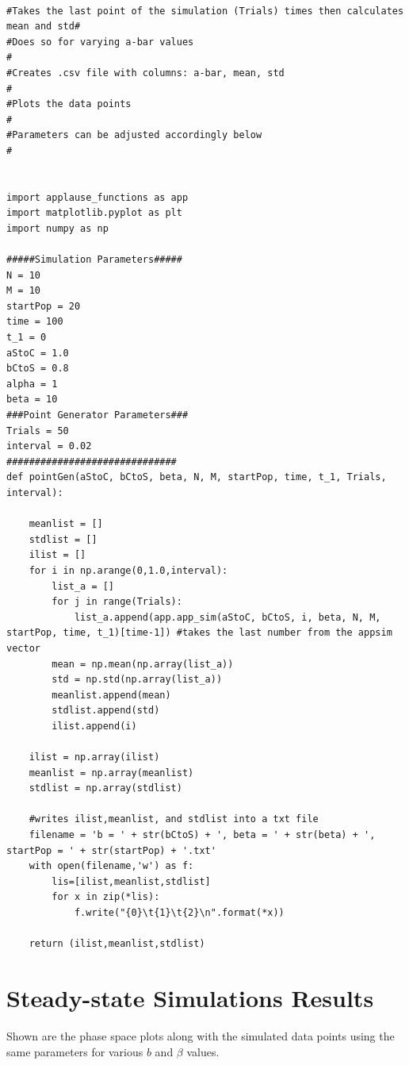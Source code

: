 \begin{lstlisting}

#Takes the last point of the simulation (Trials) times then calculates mean and std#
#Does so for varying a-bar values                                                  #
#Creates .csv file with columns: a-bar, mean, std                                  #
#Plots the data points                                                             #
#Parameters can be adjusted accordingly below                                      #


import applause_functions as app
import matplotlib.pyplot as plt
import numpy as np

#####Simulation Parameters#####
N = 10
M = 10
startPop = 20
time = 100
t_1 = 0
aStoC = 1.0
bCtoS = 0.8 
alpha = 1
beta = 10
###Point Generator Parameters###
Trials = 50
interval = 0.02
##############################
def pointGen(aStoC, bCtoS, beta, N, M, startPop, time, t_1, Trials, interval):
    
    meanlist = []
    stdlist = []
    ilist = []
    for i in np.arange(0,1.0,interval):
        list_a = []
        for j in range(Trials):
            list_a.append(app.app_sim(aStoC, bCtoS, i, beta, N, M, startPop, time, t_1)[time-1]) #takes the last number from the appsim vector
        mean = np.mean(np.array(list_a))
        std = np.std(np.array(list_a))  
        meanlist.append(mean)
        stdlist.append(std)
        ilist.append(i)

    ilist = np.array(ilist)
    meanlist = np.array(meanlist)
    stdlist = np.array(stdlist)
    
    #writes ilist,meanlist, and stdlist into a txt file
    filename = 'b = ' + str(bCtoS) + ', beta = ' + str(beta) + ', startPop = ' + str(startPop) + '.txt'    
    with open(filename,'w') as f:
        lis=[ilist,meanlist,stdlist]
        for x in zip(*lis):
            f.write("{0}\t{1}\t{2}\n".format(*x))
            
    return (ilist,meanlist,stdlist)
\end{lstlisting}

\newpage
\section{Steady-state Simulations Results}
\label{apndx:ssexpt}
Shown are the phase space plots along with the simulated data points using the same parameters for various $b$ and $\beta$ values.

